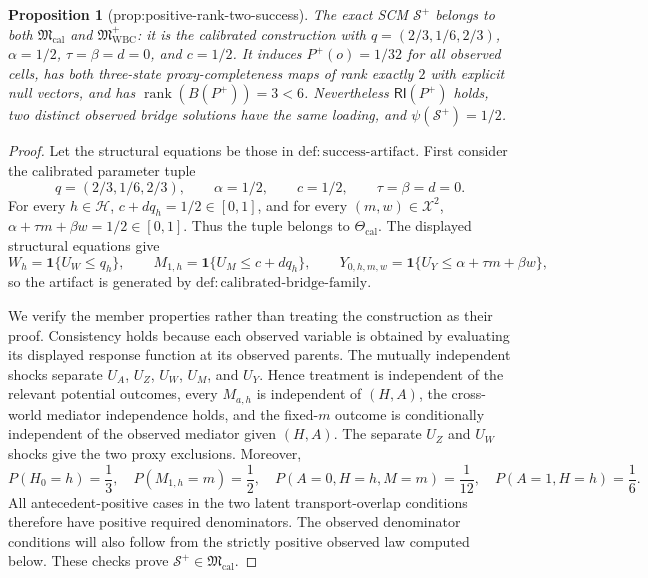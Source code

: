 \documentclass{article}
\newtheorem{proposition}{Proposition}
\begin{document}
\begin{proposition}[prop:positive-rank-two-success]\label{prop:positive-rank-two-success}
The exact SCM \(\mathcal S^+\) belongs to both \(\mathfrak M_{\mathrm{cal}}\) and \(\mathfrak M_{\mathrm{WBC}}^{+}\): it is the calibrated construction with \(q=(2/3,1/6,2/3)\), \(\alpha=1/2\), \(\tau=\beta=d=0\), and \(c=1/2\). It induces \(P^+(o)=1/32\) for all observed cells, has both three-state proxy-completeness maps of rank exactly \(2\) with explicit null vectors, and has \(\operatorname{rank}(B(P^+))=3<6\). Nevertheless \(\mathsf{RI}(P^+)\) holds, two distinct observed bridge solutions have the same loading, and \(\psi(\mathcal S^+)=1/2\).
\end{proposition}
\begin{proof}
Let the structural equations be those in \(\mathrm{def{:}success\text{-}artifact}\).  First consider the calibrated parameter tuple
\[
 q=(2/3,1/6,2/3),\qquad \alpha=1/2,\qquad c=1/2,
 \qquad \tau=\beta=d=0.
\]
For every \(h\in\mathcal H\), \(c+dq_h=1/2\in[0,1]\), and for every
\((m,w)\in\mathcal X^2\), \(\alpha+\tau m+\beta w=1/2\in[0,1]\).
Thus the tuple belongs to \(\Theta_{\mathrm{cal}}\).  The displayed structural
equations give
\[
 W_h=\mathbf 1\{U_W\le q_h\},\qquad
 M_{1,h}=\mathbf 1\{U_M\le c+dq_h\},\qquad
 Y_{0,h,m,w}=\mathbf 1\{U_Y\le\alpha+\tau m+\beta w\},
\]
so the artifact is generated by \(\mathrm{def{:}calibrated\text{-}bridge\text{-}family}\).

We verify the member properties rather than treating the construction as their
proof.  Consistency holds because each observed variable is obtained by evaluating
its displayed response function at its observed parents.  The mutually independent
shocks separate \(U_A\), \(U_Z\), \(U_W\), \(U_M\), and \(U_Y\).  Hence treatment is
independent of the relevant potential outcomes, every \(M_{a,h}\) is independent of
\((H,A)\), the cross-world mediator independence holds, and the fixed-\(m\) outcome
is conditionally independent of the observed mediator given \((H,A)\).  The separate
\(U_Z\) and \(U_W\) shocks give the two proxy exclusions.  Moreover,
\[
 P(H_0=h)=\frac13,\quad P(M_{1,h}=m)=\frac12,\quad
 P(A=0,H=h,M=m)=\frac1{12},\quad P(A=1,H=h)=\frac16.
\]
All antecedent-positive cases in the two latent transport-overlap conditions
therefore have positive required denominators.  The observed denominator conditions
will also follow from the strictly positive observed law computed below.  These
checks prove \(\mathcal S^+\in\mathfrak M_{\mathrm{cal}}\).


\end{proof}
\end{document}
